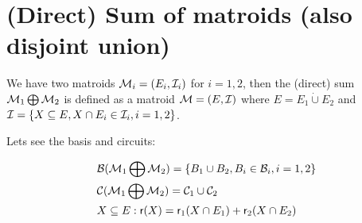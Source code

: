 \section{(Direct) Sum of matroids (also disjoint union)}

\begin{defn}
	We have two matroids $\mathcal{M}_i = (E_i, \mathcal{I}_i)$ for $i= 1,2$, then the (direct) sum $\mathcal{M}_1 \bigoplus \mathcal{M}_2$ is defined as a matroid $\mathcal{M} = (E, \mathcal{I})$ where $E = E_1 \dot\cup E_2$ and $\mathcal{I} = \{X \subseteq E, X \cap E_i \in \mathcal{I}_i, i=1,2\}$.
\end{defn}

\begin{observ}
	Lets see the basis and circuits:
	
	$$
	\begin{aligned}
		&\mathcal{B}(\mathcal{M}_1 \bigoplus \mathcal{M}_2) = \{B_1 \cup B_2, B_i \in \mathcal{B}_i, i = 1,2\}\\
		&\mathcal{C}(\mathcal{M}_1 \bigoplus \mathcal{M}_2) = \mathcal{C}_1 \cup \mathcal{C}_2\\
		&X \subseteq E : \operatorname{\textsf{r}}(X) = \operatorname{\textsf{r}}_1(X \cap E_1) + \operatorname{\textsf{r}}_2(X \cap E_2)
	\end{aligned}
	$$
\end{observ}